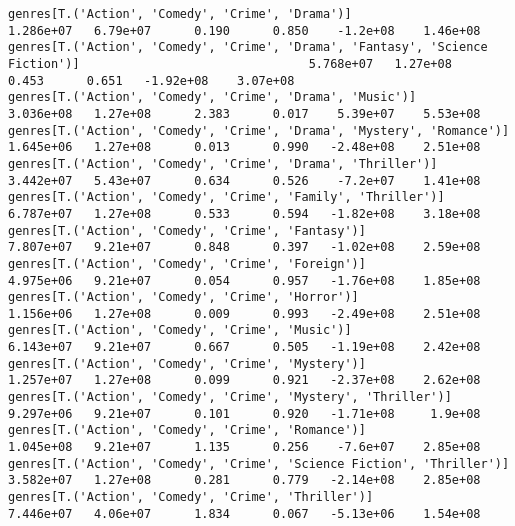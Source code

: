 \documentclass[11pt]{article}
\begin{document}
\begin{Verbatim}[commandchars=\\\{\}]
genres[T.('Action', 'Comedy', 'Crime', 'Drama')]                                                              1.286e+07   6.79e+07      0.190      0.850    -1.2e+08    1.46e+08
genres[T.('Action', 'Comedy', 'Crime', 'Drama', 'Fantasy', 'Science Fiction')]                                5.768e+07   1.27e+08      0.453      0.651   -1.92e+08    3.07e+08
genres[T.('Action', 'Comedy', 'Crime', 'Drama', 'Music')]                                                     3.036e+08   1.27e+08      2.383      0.017    5.39e+07    5.53e+08
genres[T.('Action', 'Comedy', 'Crime', 'Drama', 'Mystery', 'Romance')]                                        1.645e+06   1.27e+08      0.013      0.990   -2.48e+08    2.51e+08
genres[T.('Action', 'Comedy', 'Crime', 'Drama', 'Thriller')]                                                  3.442e+07   5.43e+07      0.634      0.526    -7.2e+07    1.41e+08
genres[T.('Action', 'Comedy', 'Crime', 'Family', 'Thriller')]                                                 6.787e+07   1.27e+08      0.533      0.594   -1.82e+08    3.18e+08
genres[T.('Action', 'Comedy', 'Crime', 'Fantasy')]                                                            7.807e+07   9.21e+07      0.848      0.397   -1.02e+08    2.59e+08
genres[T.('Action', 'Comedy', 'Crime', 'Foreign')]                                                            4.975e+06   9.21e+07      0.054      0.957   -1.76e+08    1.85e+08
genres[T.('Action', 'Comedy', 'Crime', 'Horror')]                                                             1.156e+06   1.27e+08      0.009      0.993   -2.49e+08    2.51e+08
genres[T.('Action', 'Comedy', 'Crime', 'Music')]                                                              6.143e+07   9.21e+07      0.667      0.505   -1.19e+08    2.42e+08
genres[T.('Action', 'Comedy', 'Crime', 'Mystery')]                                                            1.257e+07   1.27e+08      0.099      0.921   -2.37e+08    2.62e+08
genres[T.('Action', 'Comedy', 'Crime', 'Mystery', 'Thriller')]                                                9.297e+06   9.21e+07      0.101      0.920   -1.71e+08     1.9e+08
genres[T.('Action', 'Comedy', 'Crime', 'Romance')]                                                            1.045e+08   9.21e+07      1.135      0.256    -7.6e+07    2.85e+08
genres[T.('Action', 'Comedy', 'Crime', 'Science Fiction', 'Thriller')]                                        3.582e+07   1.27e+08      0.281      0.779   -2.14e+08    2.85e+08
genres[T.('Action', 'Comedy', 'Crime', 'Thriller')]                                                           7.446e+07   4.06e+07      1.834      0.067   -5.13e+06    1.54e+08

\end{Verbatim}
\end{document}
